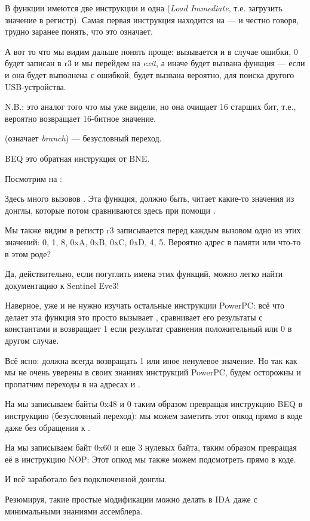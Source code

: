 В функции имеются две инструкции  
и одна  
(\emph{Load Immediate}, т.е. загрузить значение в регистр).
Самая первая инструкция находится на 
 --- и честно говоря, трудно заранее понять, что это означает.

А вот то что мы видим дальше понять проще: 
вызывается  и в случае ошибки, 0 будет записан в r3
и мы перейдем на \emph{exit}, а иначе будет вызвана функция  --- если и она будет
выполнена с ошибкой, будет вызвана
 вероятно, для поиска другого USB-устройства.

N.B.:  это аналог того что мы уже видели, но она очищает 16 старших бит,
т.е., \\
 вероятно возвращает 16-битное значение.

 (означает \emph{branch}) --- безусловный переход.

\ac{BEQ} это обратная инструкция от \ac{BNE}.

Посмотрим на :



Здесь много вызовов . 
Эта функция, должно быть, читает какие-то значения из донглы, которые потом сравниваются здесь при помощи .

Мы также видим в регистр r3 записывается перед каждым вызовом  
одно из этих значений: 0, 1, 8, 0xA, 0xB, 0xC, 0xD, 4, 5.
Вероятно адрес в памяти или что-то в этом роде?

Да, действительно, если погуглить имена этих функций, можно легко найти документацию к Sentinel Eve3!

Hаверное, уже и не нужно изучать остальные инструкции PowerPC: всё что делает эта функция это просто
вызывает , сравнивает его результаты с константами и возвращает 1 если результат сравнения положительный или 0 в другом случае.

Всё ясно:  должна всегда возвращать 1 или иное ненулевое значение.
Но так как мы не очень уверены в своих знаниях инструкций PowerPC, будем осторожны и пропатчим переходы в  на адресах
 и .

На  мы записываем байты 0x48 и 0 таким образом превращая инструкцию \ac{BEQ} 
в инструкцию  (безусловный переход):
мы можем заметить этот опкод прямо в коде даже без обращения к \PPC.

На  мы записываем байт 0x60 и еще 3 нулевых байта,
таким образом превращая её в инструкцию
\ac{NOP}:
Этот опкод мы также можем подсмотреть прямо в коде.

И всё заработало без подключенной донглы.

Резюмируя, такие простые модификации можно делать в \ac{IDA} даже с минимальными знаниями
ассемблера.

